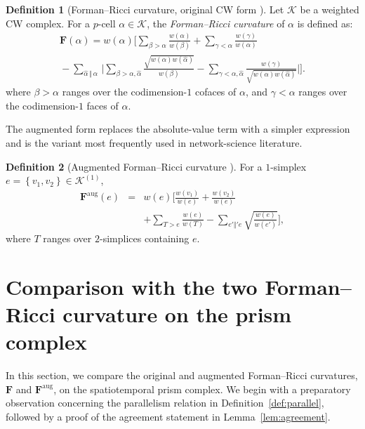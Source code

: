 \documentclass[
    pre,
    twocolumn,
    superscriptaddress,
    showpacs,
    nofootinbib,
    amsmath,
    amssymb,
    floatfix
]{revtex4-2}
\newcommand{\K}{\mathcal{K}}
\newcommand{\F}{\mathbf{F}}        %
\newcommand{\Faug}{\F^{\mathrm{aug}}}
\theoremstyle{plain} %
\theoremstyle{definition} %
\newtheorem{definition}{\indent Definition}
\begin{document}
\begin{definition}[Forman--Ricci curvature, original CW form
\cite{Forman2003}]\label{def:forman_orig}
Let $\K$ be a weighted CW complex.
For a $p$-cell $\alpha\in\K$, the \emph{Forman--Ricci curvature} of $\alpha$ is defined as:
\begin{multline}\label{eq:forman_orig}
\F(\alpha) = w(\alpha)\Biggl[
\sum_{\beta>\alpha}\frac{w(\alpha)}{w(\beta)}
+ \sum_{\gamma<\alpha}\frac{w(\gamma)}{w(\alpha)} \\
{}- \sum_{\hat\alpha\,\Vert\,\alpha}\,
\biggl|
\sum_{\beta>\alpha,\hat\alpha}\!
       \frac{\sqrt{w(\alpha)w(\hat\alpha)}}{w(\beta)}
- \sum_{\gamma<\alpha,\hat\alpha}\!
       \frac{w(\gamma)}{\sqrt{w(\alpha)w(\hat\alpha)}}
\biggr|
\Biggr].
\end{multline}
where $\beta>\alpha$ ranges over the codimension-$1$ cofaces of $\alpha$, and $\gamma<\alpha$ ranges over the codimension-$1$ faces of $\alpha$.
\end{definition}

The augmented form replaces the absolute-value term with a simpler expression and is the variant most frequently used in network-science literature.
\begin{definition}[Augmented Forman--Ricci curvature
\cite{Sreejith2016,Samal2018}]\label{def:forman_aug}
For a $1$-simplex $e = \left\{ v_1, v_2 \right\}\in\K^{(1)}$,
\begin{eqnarray}\label{eq:forman_aug}
    \Faug(e) &=& w(e)\!\Biggl[
        \frac{w(v_1)}{w(e)} + \frac{w(v_2)}{w(e)} \nonumber\\
    &\ &    + \!\sum_{T>e}\!\frac{w(e)}{w(T)} - \!\sum_{e'\Vert' e}\!\sqrt{\frac{w(e)}{w(e')}}
    \Biggl],
\end{eqnarray}
where $T$ ranges over $2$-simplices containing $e$.
\end{definition}

\section{Comparison with the two Forman--Ricci curvature on the prism complex}\label{sec:theory_compare}
In this section, we compare the original and augmented Forman--Ricci curvatures, $\F$ and $\Faug$, on the spatiotemporal prism complex.
We begin with a preparatory observation concerning the parallelism relation in Definition~\ref{def:parallel}, followed by a proof of the agreement statement in Lemma~\ref{lem:agreement}.
\end{document}

